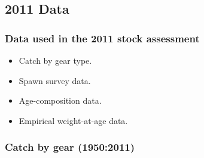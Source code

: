 \subsection{2011 Data} %
\label{sub:2011_data}
%
\begin{frame}[c]\frametitle{Data used in the 2011 stock assessment}
	\begin{itemize}
		\item Catch by gear type.
		\item Spawn survey data.
		\item Age-composition data.
		\item Empirical weight-at-age data. 
	\end{itemize}
\end{frame}
%
\begin{frame}[t]\frametitle{Catch by gear (1950:2011)}
\end{frame}
